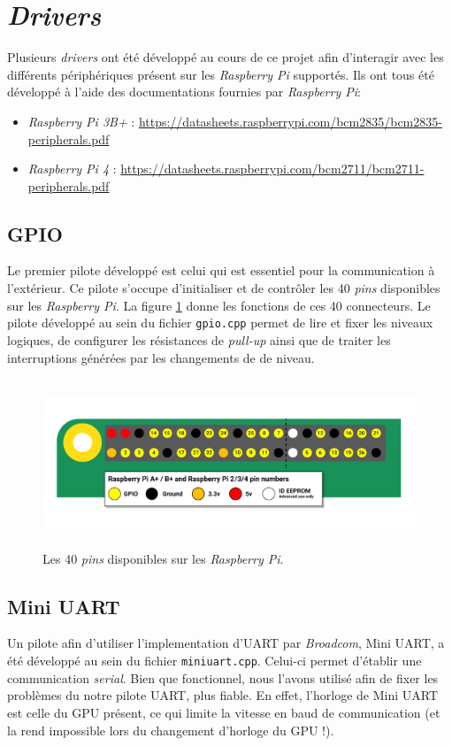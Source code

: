 \documentclass[french, 12pt]{article}
\newcommand{\rpi}{\emph{Raspberry Pi}}
\begin{document}
\section{\textit{Drivers}}
Plusieurs \textit{drivers} ont été développé au cours de ce projet afin
d'interagir avec les différents périphériques présent sur les \rpi{} supportés.
Ils ont tous été développé à l'aide des documentations fournies par \rpi{}:
\begin{itemize}
    \item \emph{Raspberry Pi 3B+} : \url{https://datasheets.raspberrypi.com/bcm2835/bcm2835-peripherals.pdf}
    \item \emph{Raspberry Pi 4} : \url{https://datasheets.raspberrypi.com/bcm2711/bcm2711-peripherals.pdf}
\end{itemize}

\subsection{GPIO}
Le premier pilote développé est celui qui est essentiel pour la communication
à l'extérieur. Ce pilote s'occupe d'initialiser et de contrôler les 40
\textit{pins} disponibles sur les \rpi{}. La figure \ref{img:gpio} donne les
fonctions de ces 40 connecteurs. Le pilote développé au sein du fichier
\texttt{gpio.cpp} permet de lire et fixer les niveaux logiques, de configurer
les résistances de \textit{pull-up} ainsi que de traiter les interruptions
générées par les changements de de niveau.

\begin{figure}[htp]
    \begin{center}
        \includegraphics[height=5cm]{gpio.png}
    \end{center}
    \caption{Les 40 \textit{pins} disponibles sur les \rpi{}.}
    \label{img:gpio}
\end{figure}

\subsection{Mini UART}
Un pilote afin d'utiliser l'implementation d'UART par \emph{Broadcom},
Mini UART, a été développé au sein du fichier \texttt{miniuart.cpp}. Celui-ci
permet d'établir une communication \emph{serial}. Bien que fonctionnel, nous
l'avons utilisé afin de fixer les problèmes du notre pilote UART, plus fiable.
En effet, l'horloge de Mini UART est celle du GPU présent, ce qui limite la
vitesse en baud de communication (et la rend impossible lors du changement
d'horloge du GPU !).
\end{document}
